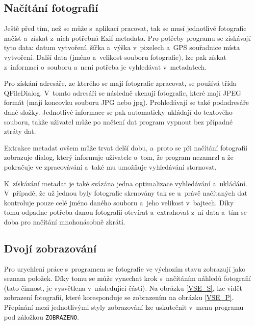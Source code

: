 \subsection*{Načítání fotografií}

Ještě před tím, než se může s~aplikací pracovat, tak se musí jednotlivé fotografie načíst a~získat z~nich potřebná Exif metadata. Pro potřeby programu se získávají tyto data: datum vytvoření, šířka a~výška v~pixelech a~GPS souřadnice místa vytvoření. Další data (jméno a~velikost souboru fotografie), lze pak získat z~informací o~souboru a~není potřeba je vyhledávat v~metadatech.

Pro získání adresáře, ze kterého se mají fotografie zpracovat, se používá třída QFileDialog. V~tomto adresáři se následně skenují fotografie, které mají JPEG formát (mají koncovku souboru JPG nebo jpg). Prohledávají se také podadresáře dané složky. Jednotlivé informace se pak automaticky ukládají do textového souboru, takže uživatel může po načtení dat program vypnout bez případné ztráty dat.

Extrakce metadat ovšem může trvat delší dobu, a~proto se při načítání fotografií zobrazuje dialog, který informuje uživatele o~tom, že program nezamrzl a že pokračuje ve zpracovávání a~také mu umožňuje vyhledávání stornovat.

K~získávání metadat je také svázána jedna optimalizace vyhledávání a~ukládání. V~případě, že už jednou byly fotografie skenovány tak se u~právě načítaných dat kontroluje pouze celé jméno daného souboru a~jeho velikost v~bajtech. Díky tomu odpadne potřeba danou fotografii otevírat a~extrahovat z~ní data a~tím se doba pro načítání mnohonásobně zkrátí.


\subsection*{Dvojí zobrazování}

Pro urychlení práce s~programem se fotografie ve výchozím stavu zobrazují jako seznam položek. Díky tomu se může vynechat krok s~načítáním náhledů fotografií (tato činnost, je vysvětlena v~následující části). Na obrázku \ref{VSE_S}, lze vidět zobrazení fotografií, které koresponduje se zobrazením na obrázku \ref{VSE_P}. Přepínání mezi jednotlivými styly zobrazování lze uskutečnit v~menu programu pod záložkou \texttt{ZOBRAZENO}.

